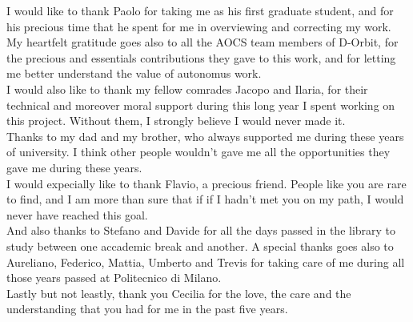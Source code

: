 I would like to thank Paolo for taking me as his first graduate student, and for his precious time that he spent for me in overviewing and correcting my work.\\
My heartfelt gratitude goes also to all the AOCS team members of D-Orbit, for the precious and essentials contributions they gave to this work, and for letting me better understand the value of autonomus work.\\
I would also like to thank my fellow comrades Jacopo and Ilaria, for their technical and moreover moral support during this long year I spent working on this project. Without them, I strongly believe I would never made it.\\
Thanks to my dad and my brother, who always supported me during these years of university. I think other people wouldn't gave me all the opportunities they gave me during these years.\\
I would expecially like to thank Flavio, a precious friend. People like you are rare to find, and I am more than sure that if if I hadn't met you
on my path, I would never have reached this goal. \\
And also thanks to Stefano and Davide for all the days passed in the library to study between one accademic break and another.
A special thanks goes also to Aureliano, Federico, Mattia, Umberto and Trevis for taking care of me during all those years passed at Politecnico di Milano.\\
Lastly but not leastly, thank you Cecilia for the love, the care and the understanding that you had for me in the past five years.

